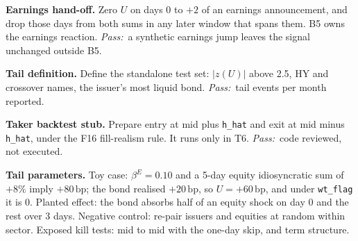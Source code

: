 \documentclass[11pt,letterpaper]{article}
\makeatletter
\newcommand{\code}[1]{\texttt{#1}}
\newcommand{\bp}{\,\mathrm{bp}}
\newcommand*{\twodigit}[1]{\expandafter\@twodigit\csname c@#1\endcsname}
\newcommand*{\@twodigit}[1]{\ifnum#1<10 0\fi\number#1}
\newcommand{\stepname}[1]{\textbf{#1.}}
\newcommand{\Pass}{\textit{Pass:}~}
\makeatother
\begin{document}
\begin{ladder}[label=\textbf{B1.\twodigit*}]
\item \stepname{Earnings hand-off} Zero $U$ on days 0 to $+2$ of an earnings announcement, and drop those days from both sums in any later window that spans them. B5 owns the earnings reaction. \Pass a synthetic earnings jump leaves the signal unchanged outside B5.
\item \stepname{Tail definition} Define the standalone test set: $|z(U)|$ above 2.5, HY and crossover names, the issuer's most liquid bond. \Pass tail events per month reported.
\item \stepname{Taker backtest stub} Prepare entry at mid plus \code{h_hat} and exit at mid minus \code{h_hat}, under the F16 fill-realism rule. It runs only in T6. \Pass code reviewed, not executed.
\end{ladder}
\textbf{Tail parameters.} Toy case: $\beta^{E}=0.10$ and a 5-day equity idiosyncratic sum of $+8\%$ imply $+80\bp$; the bond realised $+20\bp$, so $U=+60\bp$, and under \code{wt_flag} it is 0. Planted effect: the bond absorbs half of an equity shock on day 0 and the rest over 3 days. Negative control: re-pair issuers and equities at random within sector. Exposed kill tests: mid to mid with the one-day skip, and term structure.
\end{document}
